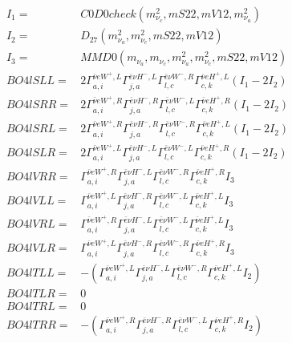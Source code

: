 \documentclass[A4,landscape]{article}
\begin{document}
\begin{align} 
I_1 = & C0D0check(m^2_{\nu_{{c}}}, mS22, mV12, m^2_{\nu_{{a}}}) \\ 
I_2 = & D_{27}(m^2_{\nu_{{a}}}, m^2_{\nu_{{c}}}, mS22, mV12) \\ 
I_3 = & MMD0(m_{\nu_{{a}}}, m_{\nu_{{c}}}, m^2_{\nu_{{a}}}, m^2_{\nu_{{c}}}, mS22, mV12) \\ 
  BO4lSLL= & 2  \Gamma^{\bar{\nu}e W^+ ,L}_{a, i} \Gamma^{\bar{e}\nu H^-,L}_{j, a} \Gamma^{\bar{e}\nu W^-,R}_{l, c} \Gamma^{\bar{\nu}e H^+ ,L}_{c, k} (I_1 - 2 I_2) \\ 
  BO4lSRR= & 2  \Gamma^{\bar{\nu}e W^+ ,R}_{a, i} \Gamma^{\bar{e}\nu H^-,R}_{j, a} \Gamma^{\bar{e}\nu W^-,L}_{l, c} \Gamma^{\bar{\nu}e H^+ ,R}_{c, k} (I_1 - 2 I_2) \\ 
  BO4lSRL= & 2  \Gamma^{\bar{\nu}e W^+ ,R}_{a, i} \Gamma^{\bar{e}\nu H^-,R}_{j, a} \Gamma^{\bar{e}\nu W^-,R}_{l, c} \Gamma^{\bar{\nu}e H^+ ,L}_{c, k} (I_1 - 2 I_2) \\ 
  BO4lSLR= & 2  \Gamma^{\bar{\nu}e W^+ ,L}_{a, i} \Gamma^{\bar{e}\nu H^-,L}_{j, a} \Gamma^{\bar{e}\nu W^-,L}_{l, c} \Gamma^{\bar{\nu}e H^+ ,R}_{c, k} (I_1 - 2 I_2) \\ 
  BO4lVRR= &  \Gamma^{\bar{\nu}e W^+ ,R}_{a, i} \Gamma^{\bar{e}\nu H^-,L}_{j, a} \Gamma^{\bar{e}\nu W^-,R}_{l, c} \Gamma^{\bar{\nu}e H^+ ,R}_{c, k} I_3 \\ 
  BO4lVLL= &  \Gamma^{\bar{\nu}e W^+ ,L}_{a, i} \Gamma^{\bar{e}\nu H^-,R}_{j, a} \Gamma^{\bar{e}\nu W^-,L}_{l, c} \Gamma^{\bar{\nu}e H^+ ,L}_{c, k} I_3 \\ 
  BO4lVRL= &  \Gamma^{\bar{\nu}e W^+ ,R}_{a, i} \Gamma^{\bar{e}\nu H^-,L}_{j, a} \Gamma^{\bar{e}\nu W^-,L}_{l, c} \Gamma^{\bar{\nu}e H^+ ,L}_{c, k} I_3 \\ 
  BO4lVLR= &  \Gamma^{\bar{\nu}e W^+ ,L}_{a, i} \Gamma^{\bar{e}\nu H^-,R}_{j, a} \Gamma^{\bar{e}\nu W^-,R}_{l, c} \Gamma^{\bar{\nu}e H^+ ,R}_{c, k} I_3 \\ 
  BO4lTLL= & -( \Gamma^{\bar{\nu}e W^+ ,L}_{a, i} \Gamma^{\bar{e}\nu H^-,L}_{j, a} \Gamma^{\bar{e}\nu W^-,R}_{l, c} \Gamma^{\bar{\nu}e H^+ ,L}_{c, k} I_2) \\ 
  BO4lTLR= & 0 \\ 
  BO4lTRL= & 0 \\ 
  BO4lTRR= & -( \Gamma^{\bar{\nu}e W^+ ,R}_{a, i} \Gamma^{\bar{e}\nu H^-,R}_{j, a} \Gamma^{\bar{e}\nu W^-,L}_{l, c} \Gamma^{\bar{\nu}e H^+ ,R}_{c, k} I_2) \\ 
\end{align} 
\end{document}
